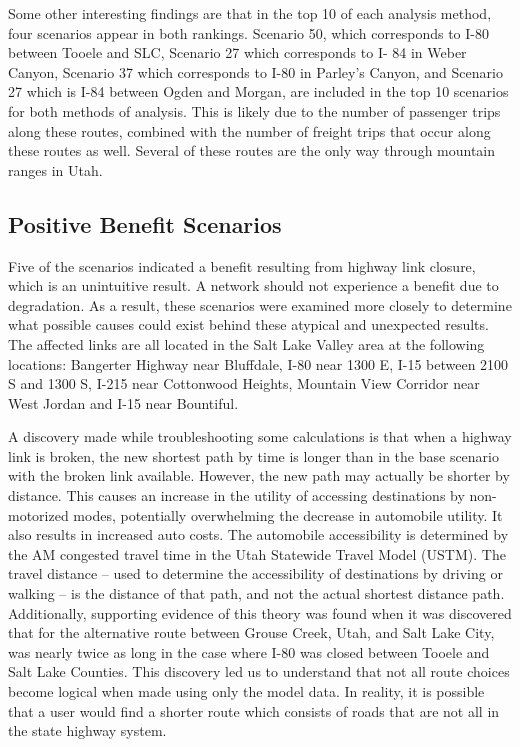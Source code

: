 Some other interesting findings are that in the top 10 of each analysis
method, four scenarios appear in both rankings. Scenario 50, which
corresponds to I-80 between Tooele and SLC, Scenario 27 which corresponds to I-
84 in Weber Canyon, Scenario 37 which corresponds to I-80 in Parley’s Canyon,
and Scenario 27 which is I-84 between Ogden and Morgan, are included in the
top 10 scenarios for both methods of analysis. This is likely due to the
number of passenger trips along these routes, combined with the number of freight
trips that occur along these routes as well. Several of these routes are
the only way through mountain ranges in Utah.

\subsection{Positive Benefit Scenarios}

Five of the scenarios indicated a benefit resulting from highway link closure,
which is an unintuitive result. A network should not experience a benefit due
to degradation. As a result, these scenarios were examined more closely to
determine what possible causes could exist behind these atypical and unexpected
results. The affected links are all located in the Salt Lake Valley area at the
following locations: Bangerter Highway near Bluffdale, I-80 near 1300 E, I-15
between 2100 S and 1300 S, I-215 near Cottonwood Heights, Mountain View
Corridor near West Jordan and I-15 near Bountiful.

A discovery made while troubleshooting some calculations is that when a highway link is broken, the new
shortest path by time is longer than in the base scenario with the broken link
available. However, the new path may actually be shorter by distance. This
causes an increase in the utility of accessing destinations by non-
motorized modes, potentially overwhelming the decrease in automobile
utility. It also results in increased auto costs. The automobile accessibility is determined by the AM congested
travel time in the Utah Statewide Travel Model (USTM). The travel distance
– used to determine the accessibility of destinations by driving or
walking – is the distance of that path, and not the actual shortest
distance path. Additionally,
supporting evidence of this theory was found when it was discovered that for
the alternative route between Grouse Creek, Utah, and Salt Lake City,
was nearly twice as long in the case where I-80 was closed between
Tooele and Salt Lake Counties. This discovery led us to understand that not all
route choices become logical when made using only the model data. In
reality, it is possible that a user would find a shorter route
which consists of roads that are not all in the state highway system.

